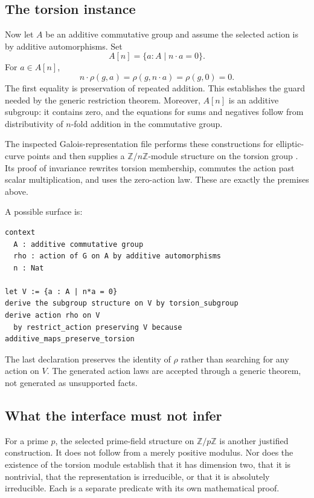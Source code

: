 \documentclass[11pt,a4paper]{article}
\newcommand{\Z}{\mathbb Z}
\theoremstyle{plain}
\theoremstyle{definition}
\begin{document}
\subsection{The torsion instance}
Now let $A$ be an additive commutative group and assume the selected action is by additive automorphisms. Set
\[
 A[n]=\{a:A\mid n\cdot a=0\}.
\]
For $a\in A[n]$,
\[
 n\cdot\rho(g,a)=\rho(g,n\cdot a)=\rho(g,0)=0.
\]
The first equality is preservation of repeated addition. This establishes the guard needed by the generic restriction theorem. Moreover, $A[n]$ is an additive subgroup: it contains zero, and the equations for sums and negatives follow from distributivity of $n$-fold addition in the commutative group.

The inspected Galois-representation file performs these constructions for elliptic-curve points and then supplies a $\Z/n\Z$-module structure on the torsion group \cite{galois}. Its proof of invariance rewrites torsion membership, commutes the action past scalar multiplication, and uses the zero-action law. These are exactly the premises above.

A possible surface is:
\par\noindent\begin{minipage}{\linewidth}
\begin{lstlisting}
context
  A : additive commutative group
  rho : action of G on A by additive automorphisms
  n : Nat

let V := {a : A | n*a = 0}
derive the subgroup structure on V by torsion_subgroup
derive action rho on V
  by restrict_action preserving V because additive_maps_preserve_torsion
\end{lstlisting}
\end{minipage}\par
The last declaration preserves the identity of $\rho$ rather than searching for any action on $V$. The generated action laws are accepted through a generic theorem, not generated as unsupported facts.

\subsection{What the interface must not infer}
For a prime $p$, the selected prime-field structure on $\Z/p\Z$ is another justified construction. It does not follow from a merely positive modulus. Nor does the existence of the torsion module establish that it has dimension two, that it is nontrivial, that the representation is irreducible, or that it is absolutely irreducible. Each is a separate predicate with its own mathematical proof.
\end{document}
